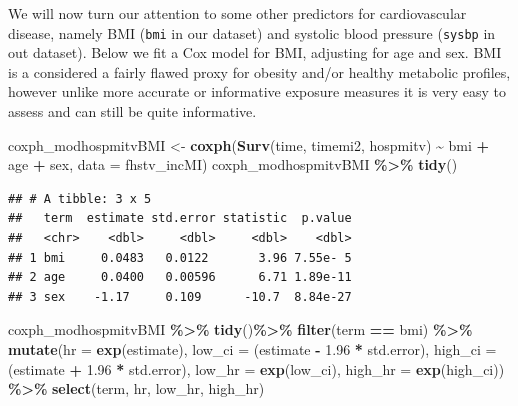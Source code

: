 \documentclass[
]{book}
\newenvironment{Shaded}{\begin{snugshade}}{\end{snugshade}}
\newcommand{\AttributeTok}[1]{\textcolor[rgb]{0.13,0.29,0.53}{#1}}
\newcommand{\FloatTok}[1]{\textcolor[rgb]{0.00,0.00,0.81}{#1}}
\newcommand{\FunctionTok}[1]{\textcolor[rgb]{0.13,0.29,0.53}{\textbf{#1}}}
\newcommand{\NormalTok}[1]{#1}
\newcommand{\OtherTok}[1]{\textcolor[rgb]{0.56,0.35,0.01}{#1}}
\newcommand{\SpecialCharTok}[1]{\textcolor[rgb]{0.81,0.36,0.00}{\textbf{#1}}}
\newcommand{\StringTok}[1]{\textcolor[rgb]{0.31,0.60,0.02}{#1}}
\begin{document}
We will now turn our attention to some other predictors for cardiovascular disease, namely BMI (\texttt{bmi} in our dataset) and systolic blood pressure (\texttt{sysbp} in out dataset). Below we fit a Cox model for BMI, adjusting for age and sex. BMI is a considered a fairly flawed proxy for obesity and/or healthy metabolic profiles, however unlike more accurate or informative exposure measures it is very easy to assess and can still be quite informative.

\begin{Shaded}
\begin{Highlighting}[]
\NormalTok{coxph\_modhospmitvBMI }\OtherTok{\textless{}{-}} \FunctionTok{coxph}\NormalTok{(}\FunctionTok{Surv}\NormalTok{(time, timemi2, hospmitv) }\SpecialCharTok{\textasciitilde{}}\NormalTok{ bmi }\SpecialCharTok{+}\NormalTok{ age }\SpecialCharTok{+}\NormalTok{ sex, }
                              \AttributeTok{data =}\NormalTok{ fhstv\_incMI)}
\NormalTok{coxph\_modhospmitvBMI }\SpecialCharTok{\%\textgreater{}\%}
  \FunctionTok{tidy}\NormalTok{()}
\end{Highlighting}
\end{Shaded}

\begin{verbatim}
## # A tibble: 3 x 5
##   term  estimate std.error statistic  p.value
##   <chr>    <dbl>     <dbl>     <dbl>    <dbl>
## 1 bmi     0.0483   0.0122       3.96 7.55e- 5
## 2 age     0.0400   0.00596      6.71 1.89e-11
## 3 sex    -1.17     0.109      -10.7  8.84e-27
\end{verbatim}

\begin{Shaded}
\begin{Highlighting}[]
\NormalTok{coxph\_modhospmitvBMI }\SpecialCharTok{\%\textgreater{}\%} 
  \FunctionTok{tidy}\NormalTok{()}\SpecialCharTok{\%\textgreater{}\%} 
  \FunctionTok{filter}\NormalTok{(term }\SpecialCharTok{==} \StringTok{\textquotesingle{}bmi\textquotesingle{}}\NormalTok{) }\SpecialCharTok{\%\textgreater{}\%}
  \FunctionTok{mutate}\NormalTok{(}\AttributeTok{hr =} \FunctionTok{exp}\NormalTok{(estimate),}
         \AttributeTok{low\_ci =}\NormalTok{ (estimate }\SpecialCharTok{{-}} \FloatTok{1.96} \SpecialCharTok{*}\NormalTok{ std.error), }
         \AttributeTok{high\_ci =}\NormalTok{ (estimate }\SpecialCharTok{+} \FloatTok{1.96} \SpecialCharTok{*}\NormalTok{ std.error), }
         \AttributeTok{low\_hr =} \FunctionTok{exp}\NormalTok{(low\_ci), }
         \AttributeTok{high\_hr =} \FunctionTok{exp}\NormalTok{(high\_ci)) }\SpecialCharTok{\%\textgreater{}\%} 
  \FunctionTok{select}\NormalTok{(term, hr, low\_hr, high\_hr)}
\end{Highlighting}
\end{Shaded}
\end{document}

